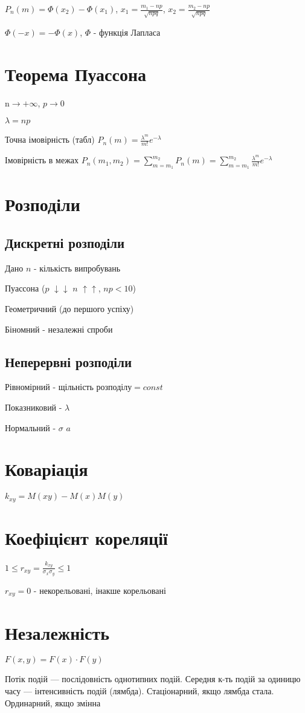 \documentclass{article}
\begin{document}
\begin{Large}
$P_n(m)=\Phi(x_2)-\Phi(x_1)$, $x_1=\frac{m_1 - np}{\sqrt{npq}}$, $x_2=\frac{m_2 - np}{\sqrt{npq}}$

$\Phi(-x) = -\Phi(x)$, $\Phi$ - функція Лапласа

\section*{Теорема Пуассона}
n$\rightarrow+\infty$, $p\rightarrow 0$

$\lambda=np$

Точна імовірність (табл)
$P_n(m)=\frac{\lambda^m}{m!}e^{-\lambda}$

Імовірність в межах
$P_n(m_1,m_2)=\sum_{m=m_1}^{m_2}P_n(m)=\sum_{m=m_1}^{m_2}\frac{\lambda^m}{m!}e^{-\lambda}$

\section*{Розподіли}
\subsection*{Дискретні розподіли}
Дано $n$ - кількість випробувань
\begin{list}{-}{}
	\item Пуассона ($p$ $\downarrow\downarrow$ $n$ $\uparrow\uparrow$, $np < 10$)
	\item Геометричний (до першого успіху)
	\item Біномний - незалежні спроби
\end{list}
\subsection*{Неперервні розподіли}
\begin{list}{-}{}
	\item Рівномірний - $\text{щільність розподілу} = const$
	\item Показниковий - $\lambda$
	\item Нормальний - $\sigma$ $a$
\end{list}

\section*{Коваріація}
$k_{xy}=M(xy)-M(x)M(y)$

\section*{Коефіцієнт кореляції}
$1\le r_{xy}=\frac{k_{xy}}{\sigma_x\sigma_y}\le 1$

$r_{xy}=0$ - некорельовані, інакше корельовані

\section*{Незалежність}
$F(x,y)=F(x)\cdot F(y)$

Потік подій — послідовність однотипних подій. Середня к-ть подій за одиницю часу — інтенсивність подій (лямбда).
Стаціонарний, якщо лямбда стала. Ординарний, якщо змінна
\end{Large}
\end{document}
